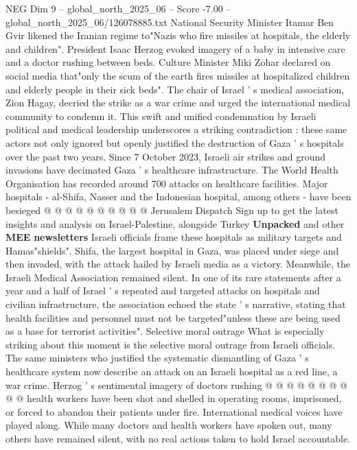 \begin{textsample}{NEG Dim 9 – global\_north\_2025\_06 – Score -7.00 – global\_north\_2025\_06/126078885.txt}  \label{ex:f9_neg_077}
National Security Minister Itamar Ben Gvir likened the Iranian regime to"Nazis who fire missiles at hospitals, the elderly and children".
President Isaac Herzog evoked imagery of a baby in intensive care and a doctor rushing between beds.
Culture Minister Miki Zohar declared on social media that"only the scum of the earth fires missiles at hospitalized children and elderly people in their sick beds".
The chair of Israel ' s medical association, Zion Hagay, decried the strike as a war crime and urged the international medical community to condemn it.
This swift and unified condemnation by Israeli political and medical leadership underscores a striking contradiction : these same actors not only ignored but openly justified the destruction of Gaza ' s hospitals over the past two years.
Since 7 October 2023, Israeli air strikes and ground invasions have decimated Gaza ' s healthcare infrastructure.
The World Health Organisation has recorded around 700 attacks on healthcare facilities.
Major hospitals - al-Shifa, Nasser and the Indonesian hospital, among others - have been besieged @ @ @ @ @ @ @ @ @ @ Jerusalem Dispatch Sign up to get the latest insights and analysis on Israel-Palestine, alongside Turkey \textbf{Unpacked} and other \textbf{MEE} \textbf{newsletters} Israeli officials frame these hospitals as military targets and Hamas"shields".
Shifa, the largest hospital in Gaza, was placed under siege and then invaded, with the attack hailed by Israeli media as a victory.
Meanwhile, the Israeli Medical Association remained silent.
In one of its rare statements after a year and a half of Israel ' s repeated and targeted attacks on hospitals and civilian infrastructure, the association echoed the state ' s narrative, stating that health facilities and personnel must not be targeted"unless these are being used as a base for terrorist activities".
Selective moral outrage What is especially striking about this moment is the selective moral outrage from Israeli officials.
The same ministers who justified the systematic dismantling of Gaza ' s healthcare system now describe an attack on an Israeli hospital as a red line, a war crime.
Herzog ' s sentimental imagery of doctors rushing @ @ @ @ @ @ @ @ @ @ health workers have been shot and shelled in operating rooms, imprisoned, or forced to abandon their patients under fire.
International medical voices have played along.
While many doctors and health workers have spoken out, many others have remained silent, with no real actions taken to hold Israel accountable.

\end{textsample}
